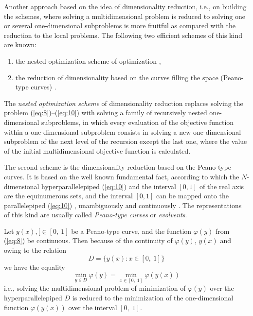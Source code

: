 Another approach based on the idea of dimensionality reduction, i.e., on building the schemes, where solving a multidimensional problem is reduced to solving one or several one-dimensional subproblems is more fruitful as compared with the reduction to the local problems. The following two efficient schemes of this kind are known:
\begin{enumerate}
\item{the nested optimization scheme  of optimization \cite{1_CarrHowe, 1_Evtushenko, 1_GerGriIsr, 1_GerGriGer, 1_GriIsrAIP, 1_GriIsrSerg, 1_GriIsrCEUR, 1_Piyavskij, 1_SergGriJCAA, 1_ShiOlaf, 1_StrMonRus, 1_StrSergMon2000, 1_vanDam},}
\item{the reduction of dimensionality based on the curves filling the space (Peano-type curves) \cite{1_Butz, 1_Goertzel, 1_HimOliPet, 1_LeraSergCNSNS, 1_LeraSergANM, 1_SergStrLeraMonogr, 1_StrMonRus,1_StrSergMon2000}.}
\end{enumerate}
The \textit{nested optimization scheme} of dimensionality reduction replaces solving the problem (\ref{eq:8})--(\ref{eq:10}) with solving a family of recursively nested one-dimensional subproblems, in which every evaluation of the objective function within a one-dimensional subproblem consists in solving a new one-dimensional subproblem of the next level of the recursion except the last one, where the value of the initial multidimensional objective function is calculated. 

The second scheme is the dimensionality reduction based on the Peano-type curves. It is based on the well known fundamental fact, according to which the $N$-dimensional hyperparallelepiped (\ref{eq:10}) and the interval $[0,1]$ of the real axis are the equinumerous sets, and the interval $[0,1]$ can be mapped onto the parallelepiped (\ref{eq:10}) , unambiguously and continuously \cite{1_SergStrLeraMonogr, 1_StrSergMon2000}. The representations of this kind are usually called \textit{Peano-type curves} or \textit{evolvents}. 

Let $y(x),[\in [0,\:1]$  be a Peano-type curve, and the function  $\varphi(y)$ from (\ref{eq:8}) be continuous. Then because of the continuity of  $\varphi(y)$, $y(x)$ and owing to the relation
\begin{displaymath}
D=\{y(x):x\in [0,\:1]\} 
\end{displaymath}
we have the equality
\begin{displaymath}
\min_{y\in D}\varphi(y)=\min_{x\in [0,\;1]}\varphi(y(x)) 
\end{displaymath}
i.e., solving the multidimensional problem of minimization of $\varphi(y)$ over the hyperparallelepiped $D$ is reduced to the minimization of the one-dimensional function $\varphi(y(x))$ over the interval $[0,\;1]$.


